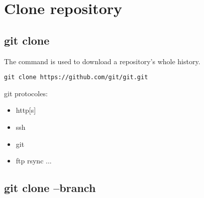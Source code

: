 \section{Clone repository}
\begin{frame}[fragile]
    \slidetitle
\end{frame}

\subsection{git clone}
\begin{frame}[fragile]
  \subslidetitle
  The command  is used to download a repository's whole history.
  \begin{lstlisting}
git clone https://github.com/git/git.git
  \end{lstlisting}

git protocoles:
\begin{itemize}
\item http[s]
\item ssh
\item git
\item ftp rsync ...
\end{itemize}
\end{frame}

\subsection{git clone --branch}
\begin{frame}[fragile]
  \subslidetitle
\end{frame}

